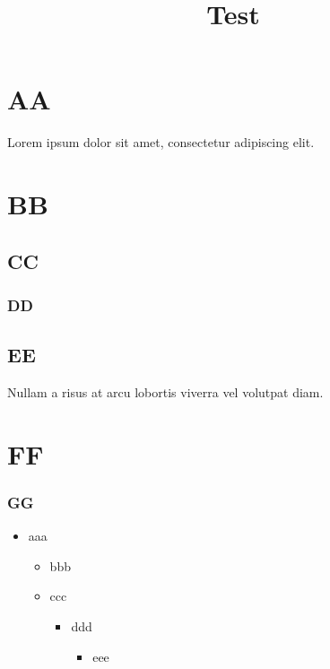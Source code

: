 \documentclass{article}
\title{Test}
\begin{document}
	\setcounter{secnumdepth}{0}
	
	\section{AA}
	Lorem ipsum dolor sit amet, consectetur adipiscing elit.
	\section{BB}
	\subsection{CC}
	\subsubsection{DD}
	\subsection{EE}
	Nullam a risus at arcu lobortis viverra vel volutpat diam.
	\section{FF}
	\subsubsection{GG}
	
	\newpage
	\meaning\theenumi
	
	\meaning\theenumii

	\meaning\theenumiii
	
	\meaning\theenumiv
	
	
	\meaning{}
	
	\meaning{}
	
	\meaning{}
	
	\meaning{}
	
	\begin{itemize}
		\item aaa
		\begin{itemize}
			\item bbb
			\item ccc
			\begin{itemize}
				\item ddd
				\begin{itemize}
					\item eee
				\end{itemize}
			\end{itemize}
		\end{itemize}
	\end{itemize}
\end{document}
